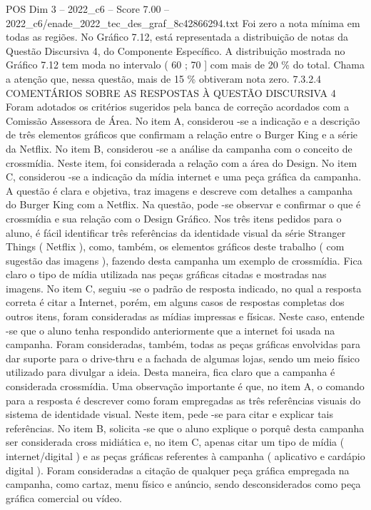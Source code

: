 \begin{textsample}{POS Dim 3 – 2022\_c6 – Score 7.00 – 2022\_c6/enade\_2022\_tec\_des\_graf\_8c42866294.txt}
Foi zero a nota mínima em todas as regiões.
No Gráfico 7.12, está representada a distribuição de notas da Questão Discursiva 4, do Componente Específico.
A distribuição mostrada no Gráfico 7.12 tem moda no intervalo ( 60 ; 70 ] com mais de 20 \% do total.
Chama a atenção que, nessa questão, mais de 15 \% obtiveram nota zero. 7.3.2.4 COMENTÁRIOS SOBRE AS RESPOSTAS À QUESTÃO DISCURSIVA 4 Foram adotados os critérios sugeridos pela banca de correção acordados com a Comissão Assessora de Área.
No item A, considerou -se a indicação e a descrição de três elementos gráficos que confirmam a relação entre o Burger King e a série da Netflix.
No item B, considerou -se a análise da campanha com o conceito de crossmídia.
Neste item, foi considerada a relação com a área do Design.
No item C, considerou -se a indicação da mídia internet e uma peça gráfica da campanha.
A questão é clara e objetiva, traz imagens e descreve com detalhes a campanha do Burger King com a Netflix.
Na questão, pode -se observar e confirmar o que é crossmídia e sua relação com o Design Gráfico.
Nos três itens pedidos para o aluno, é fácil identificar três referências da identidade visual da série Stranger Things ( Netflix ), como, também, os elementos gráficos deste trabalho ( com sugestão das imagens ), fazendo desta campanha um exemplo de crossmídia.
Fica claro o tipo de mídia utilizada nas peças gráficas citadas e mostradas nas imagens.
No item C, seguiu -se o padrão de resposta indicado, no qual a resposta correta é citar a Internet, porém, em alguns casos de respostas completas dos outros itens, foram consideradas as mídias impressas e físicas.
Neste caso, entende -se que o aluno tenha respondido anteriormente que a internet foi usada na campanha.
Foram consideradas, também, todas as peças gráficas envolvidas para dar suporte para o drive-thru e a fachada de algumas lojas, sendo um meio físico utilizado para divulgar a ideia.
Desta maneira, fica claro que a campanha é considerada crossmídia.
Uma observação importante é que, no item A, o comando para a resposta é descrever como foram empregadas as três referências visuais do sistema de identidade visual.
Neste item, pede -se para citar e explicar tais referências.
No item B, solicita -se que o aluno explique o porquê desta campanha ser considerada cross midiática e, no item C, apenas citar um tipo de mídia ( internet/digital ) e as peças gráficas referentes à campanha ( aplicativo e cardápio digital ).
Foram consideradas a citação de qualquer peça gráfica empregada na campanha, como cartaz, menu físico e anúncio, sendo desconsiderados como peça gráfica comercial ou vídeo.

\end{textsample}
